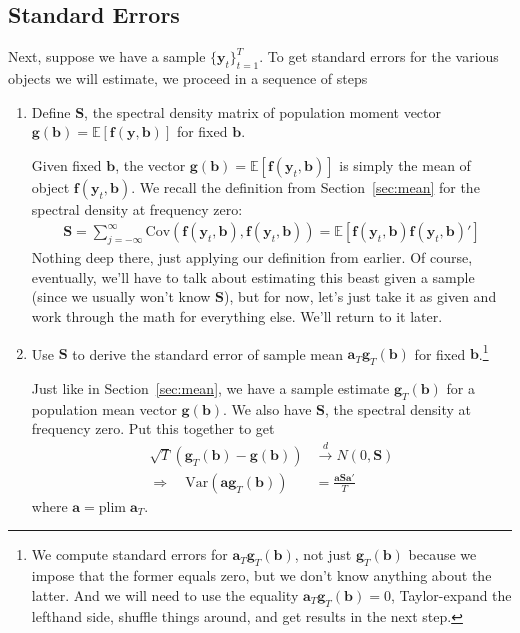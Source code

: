 \documentclass[12pt]{article}
\theoremstyle{plain}
\theoremstyle{definition}
\theoremstyle{remark}
\newcommand{\bsb}{\boldsymbol{b}}
\newcommand{\bsg}{\boldsymbol{g}}
\newcommand{\bsS}{\boldsymbol{S}}
\newcommand{\bsy}{\boldsymbol{y}}
\begin{document}
\subsection{Standard Errors}

Next, suppose we have a sample $\{\bsy_t\}^T_{t=1}$. To get
standard errors for the various objects we will estimate, we proceed in
a sequence of steps
\begin{enumerate}
  \item Define $\bsS$, the spectral density matrix of
    population moment vector
    $\bsg(
    \bsb)=\mathbb{E}[\boldsymbol{f}(\bsy,
    \bsb)]$ for fixed $\bsb$.

    Given fixed $\bsb$, the vector
    $\bsg(\bsb)
    =\mathbb{E}[\boldsymbol{f}(\bsy_t,\bsb)]$
    is simply the mean of object
    $\boldsymbol{f}(\bsy_t,\bsb)$.
    We recall the definition from Section~\ref{sec:mean} for
    the spectral density at frequency zero:
    \begin{align*}
      \bsS = \sum^\infty_{j={-\infty}}
        \text{Cov}(\boldsymbol{f}(\bsy_t,\bsb),
          \boldsymbol{f}(\bsy_t,\bsb))
        =
        \mathbb{E}\left[
        \boldsymbol{f}(\bsy_t,\bsb)
        \boldsymbol{f}(\bsy_t,\bsb)'
        \right]
    \end{align*}
    Nothing deep there, just applying our definition from earlier. Of
    course, eventually, we'll have to talk about estimating this beast
    given a sample (since we usually won't know $\bsS$), but
    for now, let's just take it as given and work through the math for
    everything else. We'll return to it later.

  \item Use $\bsS$ to derive the standard error of sample mean
    $\boldsymbol{a}_T\bsg_T(\bsb)$ for fixed
    $\bsb$.\footnote{We compute standard errors for
      $\boldsymbol{a}_T\bsg_T(\bsb)$, not just
      $\bsg_T(\bsb)$ because we impose that the
      former equals zero, but we don't know anything about the latter.
      And we will need to use the equality
      $\boldsymbol{a}_T\bsg_T(\bsb)=0$,
      Taylor-expand the lefthand side, shuffle things around, and get
      results in the next step.}

    Just like in Section~\ref{sec:mean}, we have a sample estimate
    $\bsg_T(\bsb)$ for a population mean vector
    $\bsg(\bsb)$. We also have $\bsS$, the
    spectral density at frequency zero. Put this together to get
    \begin{align*}
      \sqrt{T}\left(\bsg_T(\bsb)
      - \bsg(\bsb)\right)
      &\xrightarrow{d} N(0,\bsS)\\
      \Rightarrow \quad
      \text{Var}\left(
        \boldsymbol{a}
        \bsg_T(\bsb)
      \right)
      &=
      \frac{\boldsymbol{a}\bsS\boldsymbol{a}'}{T}
    \end{align*}
    where $\boldsymbol{a}= \text{plim}\;\boldsymbol{a}_T$.


\end{enumerate}
\end{document}

